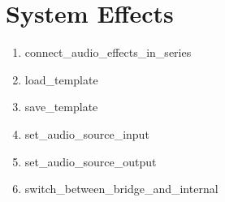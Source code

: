 \section{System Effects}

\begin{enumerate}
	\item connect\_audio\_effects\_in\_series
	\item load\_template
	\item save\_template
	\item set\_audio\_source\_input
	\item set\_audio\_source\_output
	\item switch\_between\_bridge\_and\_internal
\end{enumerate}